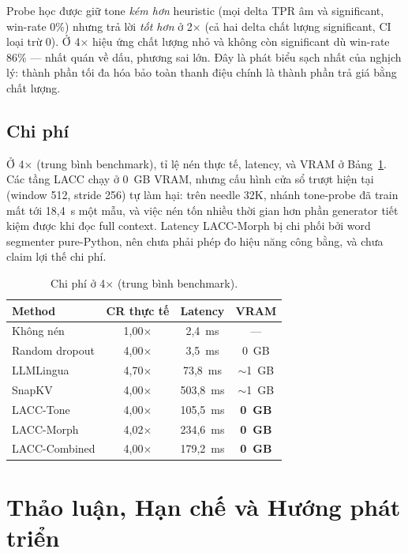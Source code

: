 \documentclass[runningheads]{llncs}
\newcommand{\method}[1]{\textsc{#1}}
\begin{document}
Probe học được giữ tone \emph{kém hơn} heuristic (mọi delta TPR âm và significant, win-rate 0\%) nhưng trả lời \emph{tốt hơn} ở 2$\times$ (cả hai delta chất lượng significant, CI loại trừ 0). Ở 4$\times$ hiệu ứng chất lượng nhỏ và không còn significant dù win-rate 86\% --- nhất quán về dấu, phương sai lớn. Đây là phát biểu sạch nhất của nghịch lý: thành phần tối đa hóa bảo toàn thanh điệu chính là thành phần trả giá bằng chất lượng.

\subsection{Chi phí}

Ở 4$\times$ (trung bình benchmark), tỉ lệ nén thực tế, latency, và VRAM ở Bảng~\ref{tab:cost}. Các tầng \method{LACC} chạy ở 0~GB VRAM, nhưng cấu hình cửa sổ trượt hiện tại (window 512, stride 256) tự làm hại: trên needle 32K, nhánh tone-probe đã train mất tới 18,4~s một mẫu, và việc nén tốn nhiều thời gian hơn phần generator tiết kiệm được khi đọc full context. Latency LACC-Morph bị chi phối bởi word segmenter pure-Python, nên chưa phải phép đo hiệu năng công bằng, và chưa claim lợi thế chi phí.

\begin{table}[H]
\centering
\caption{Chi phí ở 4$\times$ (trung bình benchmark).}
\label{tab:cost}
\begin{tabular}{lccc}
\toprule
\textbf{Method} & \textbf{CR thực tế} & \textbf{Latency} & \textbf{VRAM} \\
\midrule
Không nén & 1,00$\times$ & 2,4~ms & --- \\
Random dropout & 4,00$\times$ & 3,5~ms & 0~GB \\
LLMLingua & 4,70$\times$ & 73,8~ms & $\sim$1~GB \\
SnapKV & 4,00$\times$ & 503,8~ms & $\sim$1~GB \\
LACC-Tone & 4,00$\times$ & 105,5~ms & \textbf{0~GB} \\
LACC-Morph & 4,02$\times$ & 234,6~ms & \textbf{0~GB} \\
LACC-Combined & 4,00$\times$ & 179,2~ms & \textbf{0~GB} \\
\bottomrule
\end{tabular}
\end{table}


\section{Thảo luận, Hạn chế và Hướng phát triển}
\end{document}
